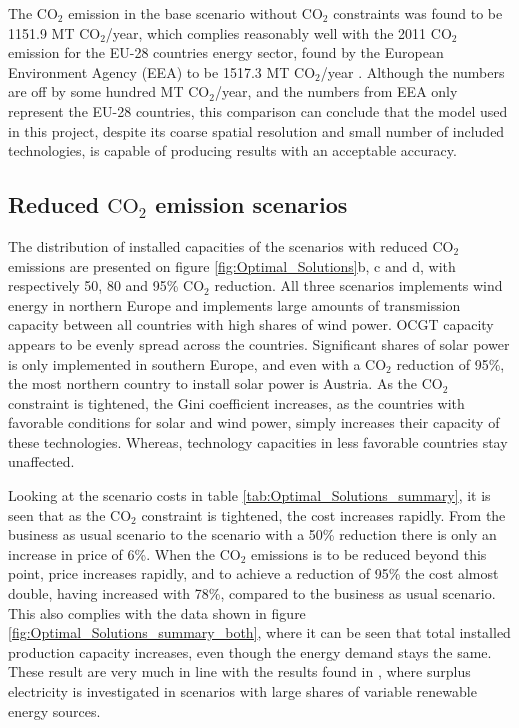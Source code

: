 The $\text{CO}_2$ emission in the base scenario without $\text{CO}_2$ constraints was found to be 1151.9 MT $\text{CO}_2$/year, which complies reasonably well with the 2011 $\text{CO}_2$ emission for the EU-28 countries energy sector, found by the European Environment Agency (EEA) to be 1517.3 MT $\text{CO}_2$/year \cite{eea_co2_emission}. Although the numbers are off by some hundred MT $\text{CO}_2$/year, and the numbers from EEA only represent the EU-28 countries, this comparison can conclude that the model used in this project, despite its coarse spatial resolution and small number of included technologies, is capable of producing results with an acceptable accuracy. 


\subsection{Reduced $\text{CO}_2$ emission scenarios}

The distribution of installed capacities of the scenarios with reduced $\text{CO}_2$ emissions are presented on figure \ref{fig:Optimal_Solutions}b, c and d, with respectively 50, 80 and 95\% $\text{CO}_2$ reduction. All three scenarios implements wind energy in northern Europe and implements large amounts of transmission capacity between all countries with high shares of wind power. OCGT capacity appears to be evenly spread across the countries. Significant shares of solar power is only implemented in southern Europe, and even with a $\text{CO}_2$ reduction of 95\%, the most northern country to install solar power is Austria. 
As the $\text{CO}_2$ constraint is tightened, the Gini coefficient increases, as the countries with favorable conditions for solar and wind power, simply increases their capacity of these technologies. Whereas, technology capacities in less favorable countries stay unaffected. 

Looking at the scenario costs in table \ref{tab:Optimal_Solutions_summary}, it is seen that as the $\text{CO}_2$ constraint is tightened, the cost increases rapidly. From the business as usual scenario to the scenario with a 50\% reduction there is only an increase in price of 6\%. When the $\text{CO}_2$ emissions is to be reduced beyond this point, price increases rapidly, and to achieve a reduction of 95\% the cost almost double, having increased with 78\%, compared to the business as usual scenario. This also complies with the data shown in figure \ref{fig:Optimal_Solutions_summary_both}, where it can be seen that total installed production capacity increases, even though the energy demand stays the same. These result are very much in line with the results found in \cite{Gorm_Surplus}, where surplus electricity is investigated in scenarios with large shares of variable renewable energy sources. 

